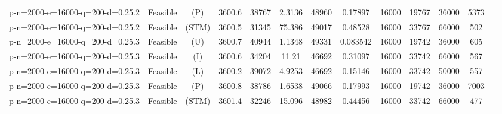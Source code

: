 \documentclass[landscape, a4paper]{article}
\newcommand{\STM}{\ensuremath{\mathrm{STM}}}
\newcommand{\Improved}{\ensuremath{\mathrm{I}}}
\newcommand{\Loose}{\ensuremath{\mathrm{L}}}
\newcommand{\Profit}{\ensuremath{\mathrm{P}}}
\newcommand{\Utility}{\ensuremath{\mathrm{U}}}
\begin{document}
\begin{center}
\begin{tabular}{lcccccccccccc}
p-n=2000-e=16000-q=200-d=0.25.2 & Feasible & (\Profit) & 3600.6 & 38767 & 2.3136 & 48960 & 0.17897 & 16000 & 19767 & 36000 & 5373 & \\
p-n=2000-e=16000-q=200-d=0.25.2 & Feasible & (\STM) & 3600.5 & 31345 & 75.386 & 49017 & 0.48528 & 16000 & 33767 & 66000 & 502 & \\
p-n=2000-e=16000-q=200-d=0.25.3 & Feasible & (\Utility) & 3600.7 & 40944 & 1.1348 & 49331 & 0.083542 & 16000 & 19742 & 36000 & 605 & \\
p-n=2000-e=16000-q=200-d=0.25.3 & Feasible & (\Improved) & 3600.6 & 34204 & 11.21 & 46692 & 0.31097 & 16000 & 33742 & 66000 & 567 & \\
p-n=2000-e=16000-q=200-d=0.25.3 & Feasible & (\Loose) & 3600.2 & 39072 & 4.9253 & 46692 & 0.15146 & 16000 & 33742 & 50000 & 557 & \\
p-n=2000-e=16000-q=200-d=0.25.3 & Feasible & (\Profit) & 3600.8 & 38786 & 1.6538 & 49066 & 0.17993 & 16000 & 19742 & 36000 & 7003 & \\
p-n=2000-e=16000-q=200-d=0.25.3 & Feasible & (\STM) & 3601.4 & 32246 & 15.096 & 48982 & 0.44456 & 16000 & 33742 & 66000 & 477 & \\
\end{tabular}
\end{center}
\end{document}
